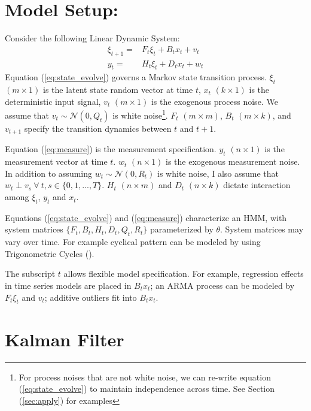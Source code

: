 \documentclass[10pt]{article}
\numberwithin{equation}{section}
\begin{document}
\section{Model Setup:} \label{sec:model_setup}
Consider the following Linear Dynamic System:
\begin{align}
    \xi_{t+1} = & F_{t}\xi_{t} + B_{t}x_t + v_t \label{eq:state_evolve} \\
    y_t = & H_t\xi_{t} + D_{t}x_t + w_t \label{eq:measure}
\end{align}
Equation (\ref{eq:state_evolve}) governs a Markov state transition process. $\xi_t$ $(m\times 1)$ is the latent state random vector at time $t$, $x_t$ $(k\times 1)$ is the deterministic input signal, $v_t$ $(m\times 1)$ is the exogenous process noise. We assume that $v_t\sim \mathcal{N}(0,Q_t)$ is white noise\footnote{For process noises that are not white noise, we can re-write equation (\ref{eq:state_evolve}) to maintain independence across time. See Section (\ref{sec:apply}) for examples}. $F_t$ $(m\times m)$, $B_t$ $(m\times k)$, and $v_{t+1}$ specify the transition dynamics between $t$ and $t+1$. 

Equation (\ref{eq:measure}) is the measurement specification. $y_t$ $(n\times 1)$ is the measurement vector at time $t$. $w_t$ $(n\times 1)$ is the exogenous measurement noise. In addition to assuming $w_t\sim \mathcal{N}(0, R_t)$ is white noise, I also assume that  $w_t \perp v_s \ \forall\  t,s\in\{0,1,...,T\}$. $H_t$ $(n\times m)$ and $D_t$ $(n\times k)$ dictate interaction among $\xi_t$, $y_t$ and $x_t$. 

Equations (\ref{eq:state_evolve}) and (\ref{eq:measure}) characterize an HMM, with system matrices $\{F_t, B_t, H_t, D_t, Q_t, R_t\}$ parameterized by $\theta$. System matrices may vary over time. For example cyclical pattern can be modeled by using Trigonometric Cycles (\cite{harvey_1985}). 

The subscript $t$ allows flexible model specification. For example, regression effects in time series models are placed in $B_t x_t$; an ARMA process can be modeled by $F_t\xi_t$ and $v_t$; additive outliers fit into $B_t x_t$.

\section{Kalman Filter} \label{sec:filter}
\end{document}

